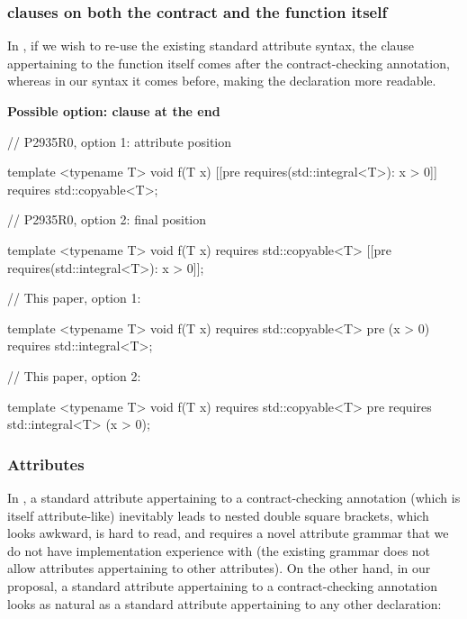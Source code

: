 \subsubsection{ clauses on both the contract and the function itself}

In \cite{P2935R0}, if we wish to re-use the existing standard attribute syntax, the  clause appertaining to the function itself comes after the contract-checking annotation, whereas in our syntax it comes before, making the declaration more readable.

\textbf{Possible option:  clause at the end}

\begin{minipage}[t]{8.7cm}
\begin{codeblock}
// P2935R0, option 1: attribute position

template <typename T>
void f(T x)
  [[pre requires(std::integral<T>): x > 0]]
  requires std::copyable<T>;
    
// P2935R0, option 2: final position

template <typename T>
void f(T x)
  requires std::copyable<T>
  [[pre requires(std::integral<T>): x > 0]];
\end{codeblock}
\end{minipage}
\begin{minipage}[t]{8cm}
\begin{codeblock}
// This paper, option 1:

template <typename T>
void f(T x)
  requires std::copyable<T>
  pre (x > 0) requires std::integral<T>;
    
// This paper, option 2:

template <typename T>
void f(T x)
  requires std::copyable<T>
  pre requires std::integral<T> (x > 0);
\end{codeblock}
\end{minipage}

\subsubsection{Attributes}

In \cite{P2935R0}, a standard attribute appertaining to a contract-checking annotation (which is itself attribute-like) inevitably leads to nested double square brackets, which looks awkward, is hard to read, and requires a novel attribute grammar that we do not have implementation experience with (the existing grammar does not allow attributes appertaining to other attributes). On the other hand, in our proposal, a standard attribute appertaining to a contract-checking annotation looks as natural as a standard attribute appertaining to any other declaration:

